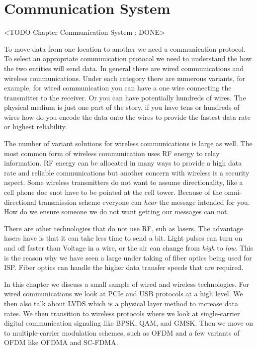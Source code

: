 \chapter{Communication System}
	<TODO Chapter Communication System : DONE>

To move data from one location to another we need a communication protocol. To select an appropriate communication protocol we need to understand the how the two entities will send data. In general there are wired communications and wireless communications. Under each category there are numerous variants, for example, for wired communication you can have a one wire connecting the transmitter to the receiver. Or you can have potentially hundreds of wires. The physical medium is just one part of the story, if you have tens or hundreds of wires how do you encode the data onto the wires to provide the fastest data rate or highest reliability.	

The number of variant solutions for wireless communications is large as well. The most common form of wireless communication uses \ac{RF} energy to relay information. \ac{RF} energy can be allocated in many ways to provide a high data rate and reliable communications but another concern with wireless is a security aspect. Some wireless transmitters do not want to assume directionality, like a cell phone doe snot have to be pointed at the cell tower. Because of the omni-directional transmission scheme everyone can \emph{hear} the message intended for you. How do we ensure someone we do not want getting our messages can not.

There are other technologies that do not use \ac{RF}, suh as lasers. The advantage lasers have is that it can take less time to send a bit. Light pulses can turn on and off faster than Voltage in a wire, or the air can change from \emph{high} to \emph{low}. This is the reason why we have seen a large under taking of fiber optics being used for \ac{ISP}. Fiber optics can handle the higher data transfer speeds that are required.

In this chapter we discuss a small sample of wired and wireless technologies. For wired communications we look at \ac{PCIe} and \ac{USB} protocols at a high level. We then also talk about \ac{LVDS} which is a physical layer method to increase data rates. We then transition to wireless protocols where we look at single-carrier digital communication signaling like \ac{BPSK}, \ac{QAM}, and \ac{GMSK}. Then we move on to multiple-carrier modulation schemes, such as \ac{OFDM} and a few variants of \ac{OFDM} like \ac{OFDMA} and \ac{SC-FDMA}.

